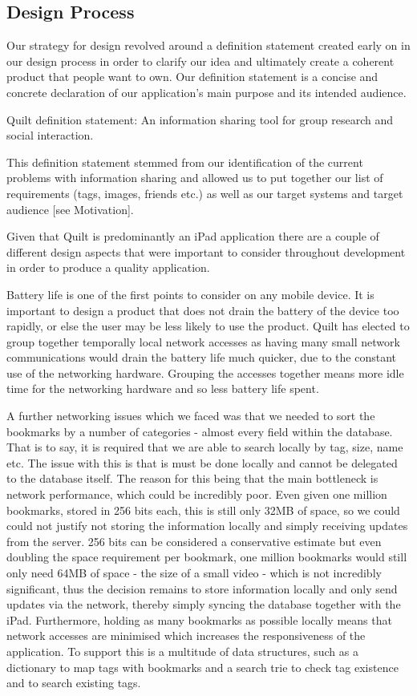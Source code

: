 \documentclass[a4wide, 10pt]{article}
\begin{document}
\subsection{Design Process}

Our strategy for design revolved around a definition statement created early on in our design process in order to clarify our idea and ultimately create a coherent product that people want to own. Our definition statement is a concise and concrete declaration of our application's main purpose and its intended audience.

Quilt definition statement: An information sharing tool for group research and social interaction.

This definition statement stemmed from our identification of the current problems with information sharing and allowed us to put together our list of requirements (tags, images, friends etc.) as well as our target systems and target audience [see Motivation].

Given that Quilt is predominantly an iPad application there are a couple of different design aspects that were important to consider throughout development in order to produce a quality application.

Battery life is one of the first points to consider on any mobile device. It is important to design a product that does not drain the battery of the device too rapidly, or else the user may be less likely to use the product. Quilt has elected to group together temporally local network accesses as having many small network communications would drain the battery life much quicker, due to the constant use of the networking hardware. Grouping the accesses together means more idle time for the networking hardware and so less battery life spent.

A further networking issues which we faced was that we needed to sort the bookmarks by a number of categories - almost every field within the database. That is to say, it is required that we are able to search locally by tag, size, name etc. The issue with this is that is must be done locally and cannot be delegated to the database itself. The reason for this being that the main bottleneck is network performance, which could be incredibly poor. Even given one million bookmarks, stored in 256 bits each, this is still only 32MB of space, so we could could not justify not storing the information locally and simply receiving updates from the server. 256 bits can be considered a conservative estimate but even doubling the space requirement per bookmark, one million bookmarks would still only need 64MB of space - the size of a small video - which is not incredibly significant, thus the decision remains to store information locally and only send updates via the network, thereby simply syncing the database together with the iPad. Furthermore, holding as many bookmarks as possible locally means that network accesses are minimised which increases the responsiveness of the application. To support this is a multitude of data structures, such as a dictionary to map tags with bookmarks and a search trie to check tag existence and to search existing tags.
\end{document}
